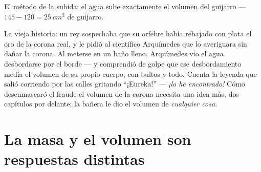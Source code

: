 \begin{omfigure}

{\small El método de la subida: el agua sube exactamente el
volumen del guijarro --- $145 - 120 = \qty{25}{cm^3}$ de guijarro.}
\end{omfigure}

\begin{example}\label{ex:g6:mass-and-volume:archimedes}
La vieja historia: un rey sospechaba que su orfebre había rebajado con
plata el oro de la corona real, y le pidió al científico Arquímedes
que lo averiguara sin dañar la corona. Al meterse en un baño lleno,
Arquímedes vio el agua desbordarse por el borde --- y comprendió de
golpe que ese desbordamiento medía el volumen de su propio cuerpo,
con bultos y todo. Cuenta la leyenda que salió corriendo por las calles
gritando ``¡Eureka!'' --- \emph{¡lo he encontrado!} Cómo desenmascaró
el fraude el volumen de la corona necesita una idea más, dos capítulos
por delante; la bañera le dio el volumen de \emph{cualquier cosa}.
\end{example}

\section{La masa y el volumen son respuestas distintas}

